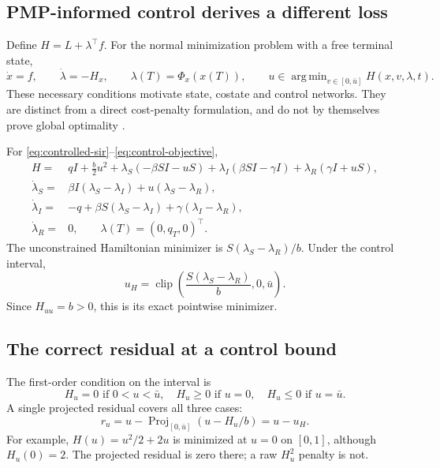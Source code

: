 \documentclass[11pt,a4paper]{article}
\DeclareMathOperator{\proj}{Proj}
\DeclareMathOperator{\clip}{clip}
\DeclareMathOperator*{\argmin}{arg\,min}
\theoremstyle{definition}
\theoremstyle{remark}
\begin{document}
\subsection{PMP-informed control derives a different loss}
Define $H=L+\lambda^\top f$. For the normal minimization problem with a free terminal state,
\begin{equation}
\dot x=f,\qquad \dot\lambda=-H_x,\qquad
\lambda(T)=\Phi_x(x(T)),\qquad
u\in\argmin_{v\in[0,\bar u]}H(x,v,\lambda,t).
\label{eq:pmp}
\end{equation}
These necessary conditions motivate state, costate and control networks. They are distinct from a direct cost-penalty formulation, and do not by themselves prove global optimality \cite{lenhart,liberzon}.

For \eqref{eq:controlled-sir}--\eqref{eq:control-objective},
\begin{align}
H={}&qI+\frac{b}{2}u^2+\lambda_S(-\beta SI-uS)
+\lambda_I(\beta SI-\gamma I)+\lambda_R(\gamma I+uS),\nonumber\\
\dot\lambda_S={}&\beta I(\lambda_S-\lambda_I)+u(\lambda_S-\lambda_R),\nonumber\\
\dot\lambda_I={}&-q+\beta S(\lambda_S-\lambda_I)+\gamma(\lambda_I-\lambda_R),\label{eq:sir-costate}\\
\dot\lambda_R={}&0,\qquad \lambda(T)=(0,q_T,0)^\top.\nonumber
\end{align}
The unconstrained Hamiltonian minimizer is $S(\lambda_S-\lambda_R)/b$. Under the control interval,
\begin{equation}
u_H=\clip\left(\frac{S(\lambda_S-\lambda_R)}{b},0,\bar u\right).
\label{eq:pmp-control}
\end{equation}
Since $H_{uu}=b>0$, this is its exact pointwise minimizer.

\subsection{The correct residual at a control bound}
The first-order condition on the interval is
\begin{equation}
H_u=0\text{ if }0<u<\bar u,\quad
H_u\ge0\text{ if }u=0,\quad
H_u\le0\text{ if }u=\bar u.
\end{equation}
A single projected residual covers all three cases:
\begin{equation}
r_u=u-\proj_{[0,\bar u]}(u-H_u/b)=u-u_H.
\label{eq:projected-pmp}
\end{equation}
For example, $H(u)=u^2/2+2u$ is minimized at $u=0$ on $[0,1]$, although $H_u(0)=2$. The projected residual is zero there; a raw $H_u^2$ penalty is not.
\end{document}
